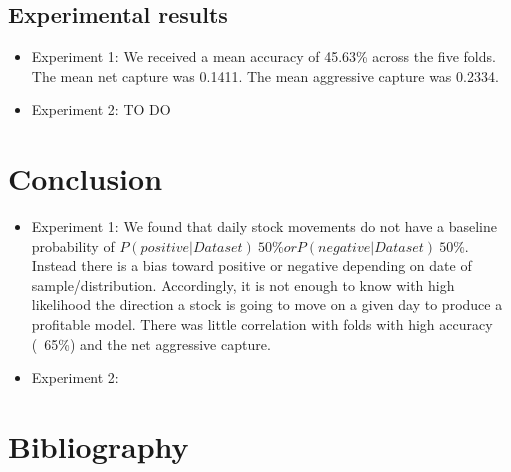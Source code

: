 \documentclass[11pt,letterpaper]{article}
\newcommand{\blue}[1]{\textcolor{RoyalBlue}{#1}}
\newcommand{\instructions}[1]{\blue{\textit{#1}}}
\begin{document}
\subsection{Experimental results}
\label{sec:experimental-results}
\begin{itemize}
\item Experiment 1: We received a mean accuracy of 45.63\% across the five folds.
  The mean net capture was 0.1411. The mean aggressive capture was 0.2334.
\item Experiment 2: TO DO
\end{itemize}

\section{Conclusion}
\begin{itemize}
\item Experiment 1: We found that daily stock movements do not have a
  baseline probability of $P(positive | Dataset) ~ 50\% or P(negative | Dataset) ~ 50\%$.
  Instead there is a bias toward positive or negative depending on date of sample/distribution.
  Accordingly, it is not enough to know with high likelihood the direction a
  stock is going to move on a given day to produce a profitable model. There
  was little correlation with folds with high accuracy (~65\%) and the
  net aggressive capture.
\item Experiment 2:
\end{itemize}


\section*{Bibliography}
{}

\end{document}
